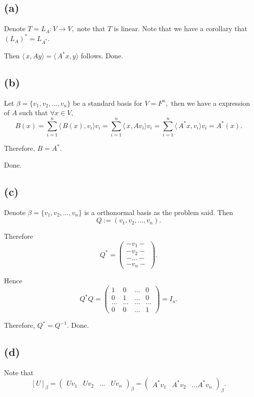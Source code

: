 \documentclass[12pt]{article}%
\begin{document}
\subsection{(a)}
Denote $T=L_{A}:V \to V,$ note that $T$ is linear. Note that we have a corollary that $(L_{A})^{*}=L_{A^{*}}.$

Then $\langle\,x,Ay\rangle=\langle\,A^{*}x,y\rangle$ follows. Done.

\subsection{(b)}
Let $\beta=\{v_1,v_2,\dots, v_n\}$ be a standard basis for $V=F^{n},$ then we have a expression of $A$ such that $\forall x \in V,$
$$B(x)=\sum_{i=1}^{n}\langle\,B(x),v_i\rangle v_i=\sum_{i=1}^{n}\langle\,x,Av_i\rangle v_i=\sum_{i=1}^{n}\langle\,A^{*}x,v_i\rangle v_i=A^{*}(x).$$

Therefore, $B=A^{*}.$

Done.

\subsection{(c)}
Denote $\beta=\{v_1,v_2,\dots, v_n\}$ is a orthonormal basis as the problem said.
Then $$Q:=(v_1,v_2,\dots,v_n).$$

Therefore $$Q^{*}=\begin{pmatrix} - v_1 - \\ - v_2 - \\ - \dots -  \\ - v_n -\end{pmatrix}.$$

Hence $$Q^{*}Q=\begin{pmatrix} 1&0&...&0 \\ 0 & 1&\dots &0 \\ \dots&\dots&\dots&\dots \\ 0&0&\dots&1 \end{pmatrix} = I_n.$$

Therefore, $Q^{*}=Q^{-1}.$ Done.

\subsection{(d)}
Note that $$[U]_{\beta}=\begin{pmatrix} Uv_1& Uv_2& \dots & Uv_n \end{pmatrix}_{\beta}=\begin{pmatrix} A^{*}v_1 &A^{*}v_2&\dots A^{*}v_n \end{pmatrix}_{\beta}.$$
\end{document}
